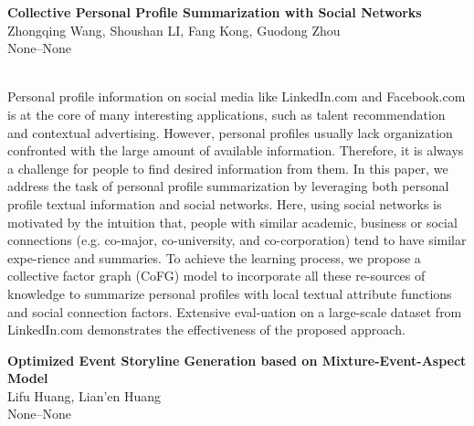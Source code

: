 \documentclass[twoside,makeidx]{book}
\renewcommand{\normalsize}{\fontsize{8}{9}\selectfont}
\renewcommand{\small}{\fontsize{7}{8}\selectfont}
\begin{document}
\par\vspace{2em}\noindent%
\begin{minipage}{\linewidth}%
\begin{center}
\textbf{\normalsize Collective Personal Profile Summarization with Social Networks}\\
\normalsize  Zhongqing Wang,  Shoushan LI,  Fang Kong,  Guodong Zhou\\
{\small None--None}\\
\end{center}
\end{minipage}\\[0.5em]
\nopagebreak%
\noindent%
{\small Personal profile information on social media like LinkedIn.com and Facebook.com is at the core of many interesting applications, such as talent recommendation and contextual advertising. However, personal profiles usually lack organization confronted with the large amount of available information. Therefore, it is always a challenge for people to find desired information from them. In this paper, we address the task of personal profile summarization by leveraging both personal profile textual information and social networks. Here, using social networks is motivated by the intuition that, people with similar academic, business or social connections (e.g. co-major, co-university, and co-corporation) tend to have similar expe-rience and summaries. To achieve the learning process, we propose a collective factor graph (CoFG) model to incorporate all these re-sources of knowledge to summarize personal profiles with local textual attribute functions and social connection factors. Extensive eval-uation on a large-scale dataset from LinkedIn.com demonstrates the effectiveness of the proposed approach.}
\par\vspace{2em}\noindent%
\begin{minipage}{\linewidth}%
\begin{center}
\textbf{\normalsize Optimized Event Storyline Generation based on Mixture-Event-Aspect Model}\\
\normalsize  Lifu Huang,  Lian'en Huang\\
{\small None--None}\\
\end{center}
\end{minipage}\\[0.5em]
\nopagebreak%
\noindent%
\end{document}
